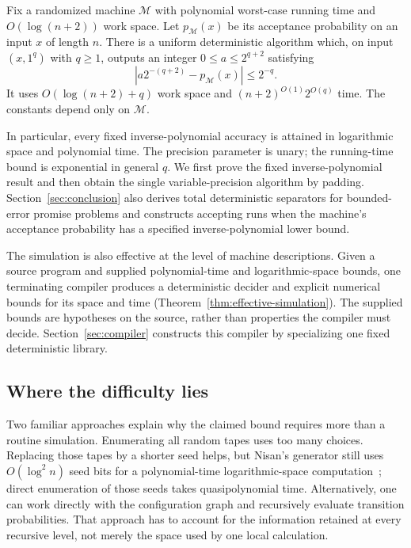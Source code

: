 \begin{theorem}\label{thm:probability}
Fix a randomized machine $\mathcal M$ with polynomial worst-case
running time and $O(\log(n+2))$ work space. Let $p_{\mathcal M}(x)$ be
its acceptance probability on an input $x$ of length $n$. There is a
uniform deterministic algorithm which, on input $(x,1^q)$ with $q\ge1$,
outputs an integer $0\le a\le2^{q+2}$ satisfying
\[
       \left|a2^{-(q+2)}-p_{\mathcal M}(x)\right|\le2^{-q}.
\]
It uses $O(\log(n+2)+q)$ work space and
$(n+2)^{O(1)}2^{O(q)}$ time. The constants depend only on $\mathcal M$.
\end{theorem}

In particular, every fixed inverse-polynomial accuracy is attained in
logarithmic space and polynomial time. The precision parameter is unary;
the running-time bound is exponential in general $q$. We first prove
the fixed inverse-polynomial result and then obtain the single
variable-precision algorithm by padding. Section~\ref{sec:conclusion}
also derives total deterministic separators for bounded-error promise
problems and constructs accepting runs when the machine's acceptance
probability has a specified inverse-polynomial lower bound.

The simulation is also effective at the level of machine descriptions.
Given a source program and supplied polynomial-time and logarithmic-space
bounds, one terminating compiler produces a deterministic decider and
explicit numerical bounds for its space and time
(Theorem~\ref{thm:effective-simulation}). The supplied bounds are
hypotheses on the source, rather than properties the compiler must decide.
Section~\ref{sec:compiler} constructs this compiler by specializing one
fixed deterministic library.


\subsection{Where the difficulty lies}

Two familiar approaches explain why the claimed bound requires more than a routine simulation. Enumerating all random tapes uses too many choices. Replacing those tapes by a shorter seed helps, but Nisan's generator still uses $O(\log^2 n)$ seed bits for a polynomial-time logarithmic-space computation~\cite{Nisan1992}; direct enumeration of those seeds takes quasipolynomial time. Alternatively, one can work directly with the configuration graph and recursively evaluate transition probabilities. That approach has to account for the information retained at every recursive level, not merely the space used by one local calculation.

